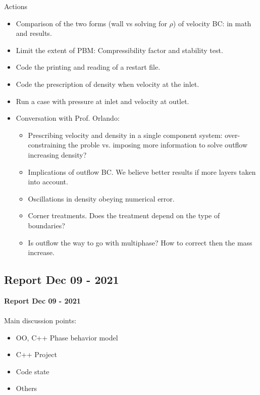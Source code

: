 \documentclass{beamer}
\begin{document}
	\begin{frame}{Actions}
		\begin{itemize}
			\item Comparison of the two forms (wall vs solving for $\rho$) of velocity BC: in math and results.
			\item Limit the extent of PBM: Compressibility factor and stability test.
			\item Code the printing and reading of a restart file.
			\item Code the prescription of density when velocity at the inlet.
			\item Run a case with pressure at inlet and velocity at outlet.
			\item Conversation with Prof. Orlando:
			\begin{itemize}
				\item Prescribing velocity and density in a single component system: over-constraining the proble vs. imposing more information to solve outflow increasing density?
				\item Implications of outflow BC. We believe better results if more layers taken into account.
				\item Oscillations in density obeying numerical error.
				\item Corner treatments. Does the treatment depend on the type of boundaries?
				\item Is outflow the way to go with multiphase? How to correct then the mass increase.
			\end{itemize}
		\end{itemize}
	\end{frame}
	\subsection{Report Dec 09 - 2021}
	\justifying
	\begin{frame}
		\textbf{Report Dec 09 - 2021}\\~\\
		Main discussion points:
		\begin{itemize}
			\item OO, C++ Phase behavior model
			\item C++ Project
			\item Code state
			\item Others
		\end{itemize}
	\end{frame}
	
\end{document}
